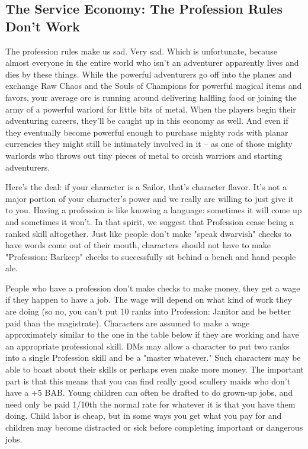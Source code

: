 \subsection{The Service Economy: The Profession Rules Don't Work}

The profession rules make us sad. Very sad. Which is unfortunate, because almost everyone in the entire world who isn't an adventurer apparently lives and dies by these things. While the powerful adventurers go off into the planes and exchange Raw Chaos and the Souls of Champions for powerful magical items and favors, your average orc is running around delivering halfling food or joining the army of a powerful warlord for little bits of metal. When the players begin their adventuring careers, they'll be caught up in this economy as well. And even if they eventually become powerful enough to purchase mighty rods with planar currencies they might still be intimately involved in it -- as one of those mighty warlords who throws out tiny pieces of metal to orcish warriors and starting adventurers.

Here's the deal: if your character is a Sailor, that's character flavor. It's not a major portion of your character's power and we really are willing to just give it to you. Having a profession is like knowing a language: sometimes it will come up and sometimes it won't. In that spirit, we suggest that Profession cease being a ranked skill altogether. Just like people don't make "speak dwarvish" checks to have words come out of their mouth, characters should not have to make "Profession: Barkeep" checks to successfully sit behind a bench and hand people ale.

People who have a profession don't make checks to make money, they get a wage if they happen to have a job. The wage will depend on what kind of work they are doing (so no, you can't put 10 ranks into Profession: Janitor and be better paid than the magistrate). Characters are assumed to make a wage approximately similar to the one in the table below if they are working and have an appropriate professional skill. DMs may allow a character to put two ranks into a single Profession skill and be a "master whatever."  Such characters may be able to boast about their skills or perhaps even make more money. The important part is that this means that you can find really good scullery maids who don't have a +5 BAB. Young children can often be drafted to do grown-up jobs, and need only be paid 1/10th the normal rate for whatever it is that you have them doing. Child labor is cheap, but in some ways you get what you pay for and children may become distracted or sick before completing important or dangerous jobs.

